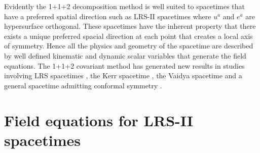 \documentclass[abstract=on,notitlepage,superscriptaddress,nofootinbib,aps,preprint,prd]{revtex4}
\newcommand{\0}{^{(0)}}
\newcommand{\1}{^{(1)}}
\newcommand{\2}{^{(2)}}
\newcommand{\3}{{}^{(3)}}
\begin{document}
Evidently the 1+1+2 decomposition method is well suited to spacetimes that have a preferred spatial direction such as LRS-II spacetimes where $u^a$ and $e^a$ are hypersurface orthogonal. These spacetimes have the inherent property that there exists a unique preferred spacial direction at each point that creates a local axis of symmetry. Hence all the physics and geometry of the spacetime are described by well defined kinematic and dynamic scalar variables that generate the field equations. The 1+1+2 covariant method has generated new results in studies involving LRS spacetimes \cite{sayuri}, the Kerr spacetime \cite{kerr}, the Vaidya spacetime \cite{vaidya} and a general spacetime admitting conformal symmetry \cite{CKV}.


\section{Field equations for LRS-II spacetimes}
\end{document}
